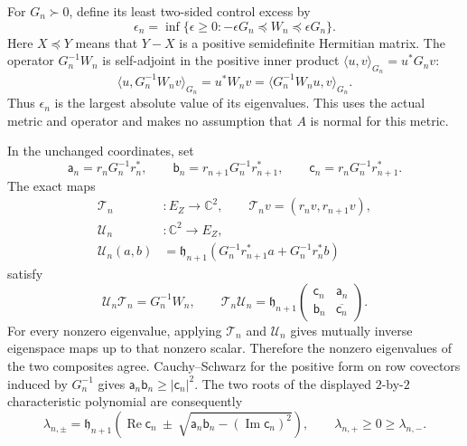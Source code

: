 For \(G_n\succ0\), define its least two-sided control excess by
\begin{equation}
\epsilon_n=\inf\{\epsilon\ge0:
               -\epsilon G_n\preceq W_n\preceq\epsilon G_n\}.
\tag{BF.18}\label{CFStage:BF:BF:eq:excess-definition}
\end{equation}
Here \(X\preceq Y\) means that \(Y-X\) is a positive semidefinite
Hermitian matrix.  The operator \(G_n^{-1}W_n\) is self-adjoint in
the positive inner product \(\langle u,v\rangle_{G_n}=u^*G_nv\):
\[
\langle u,G_n^{-1}W_nv\rangle_{G_n}=u^*W_nv
=\langle G_n^{-1}W_nu,v\rangle_{G_n}.
\]
Thus \(\epsilon_n\) is the largest absolute value of its eigenvalues.
This uses the actual metric and operator and makes no assumption that
\(A\) is normal for this metric.

In the unchanged coordinates, set
\begin{equation}
\mathsf a_n=r_nG_n^{-1}r_n^*,\qquad
\mathsf b_n=r_{n+1}G_n^{-1}r_{n+1}^*,\qquad
\mathsf c_n=r_nG_n^{-1}r_{n+1}^*.
\tag{BF.19}\label{CFStage:BF:BF:eq:abc}
\end{equation}
The exact maps
\begin{equation}
\begin{split}
\mathcal T_n&:E_Z\longrightarrow\mathbb C^2,
\qquad\mathcal T_nv=(r_nv,r_{n+1}v),\\
\mathcal U_n&:\mathbb C^2\longrightarrow E_Z,\\
\mathcal U_n(a,b)
 &=\mathfrak h_{n+1}
    \left(G_n^{-1}r_{n+1}^*a+G_n^{-1}r_n^*b\right)
\end{split}
\tag{BF.20}\label{CFStage:BF:BF:eq:factor-maps}
\end{equation}
satisfy
\[
\mathcal U_n\mathcal T_n=G_n^{-1}W_n,\qquad
\mathcal T_n\mathcal U_n
=\mathfrak h_{n+1}
  \begin{pmatrix}
   \mathsf c_n&\mathsf a_n\\
   \mathsf b_n&\overline{\mathsf c_n}
  \end{pmatrix}.
\]
For every nonzero eigenvalue, applying \(\mathcal T_n\) and
\(\mathcal U_n\) gives mutually inverse eigenspace maps up to that
nonzero scalar.  Therefore the nonzero eigenvalues of the two
composites agree.  Cauchy--Schwarz for the positive form on row
covectors induced by \(G_n^{-1}\) gives
\(\mathsf a_n\mathsf b_n\ge|\mathsf c_n|^2\).
The two roots of the displayed \(2\)-by-\(2\) characteristic
polynomial are consequently
\begin{equation}
\lambda_{n,\pm}
=\mathfrak h_{n+1}
 \left(\operatorname{Re}\mathsf c_n
 \ \pm\
 \sqrt{\mathsf a_n\mathsf b_n-
               (\operatorname{Im}\mathsf c_n)^2}\right),
\qquad \lambda_{n,+}\ge0\ge\lambda_{n,-}.
\tag{BF.21}\label{CFStage:BF:BF:eq:two-roots}
\end{equation}
